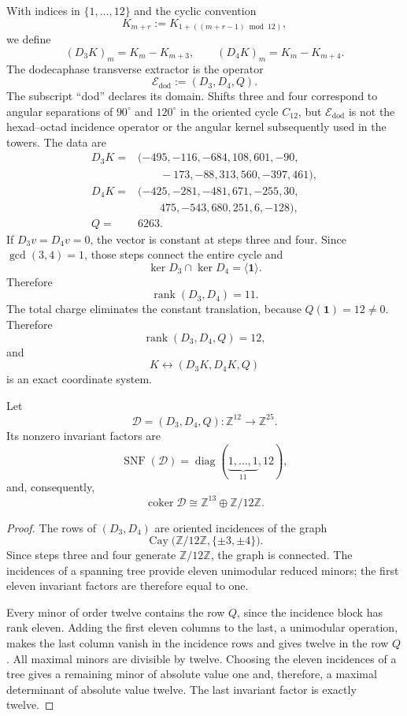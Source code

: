 With indices in \(\{1,\ldots,12\}\) and the cyclic convention
\[
 K_{m+r}:=K_{1+((m+r-1)\bmod12)},
\]
we define
\[
(D_3K)_m=K_m-K_{m+3},
\qquad
(D_4K)_m=K_m-K_{m+4}.
\]
The dodecaphase transverse extractor is the operator
\[
 \mathcal E_{\mathrm{dod}}
 :=(D_3,D_4,Q).
\]
The subscript ``dod'' declares its domain. Shifts three and four
correspond to angular separations of \(90^\circ\) and \(120^\circ\) in the
oriented cycle \(C_{12}\), but \(\mathcal E_{\mathrm{dod}}\) is not the
hexad--octad incidence operator or the angular kernel subsequently used in
the towers.
The data are
\[
\begin{aligned}
D_3K={}&(-495,-116,-684,108,601,-90,\\
       &\qquad-173,-88,313,560,-397,461),\\[1mm]
D_4K={}&(-425,-281,-481,671,-255,30,\\
       &\qquad475,-543,680,251,6,-128),\\[1mm]
Q={}&6263.
\end{aligned}
\]
If \(D_3v=D_4v=0\), the vector is constant at steps three and four. Since
\(\gcd(3,4)=1\), those steps connect the entire cycle and
\[
\ker D_3\cap\ker D_4=\langle\mathbf1\rangle.
\]
Therefore
\[
\operatorname{rank}(D_3,D_4)=11.
\]
The total charge eliminates the constant translation, because
\(Q(\mathbf1)=12\ne0\). Therefore
\[
\boxed{\operatorname{rank}(D_3,D_4,Q)=12,}
\]
and
\[
K\longleftrightarrow(D_3K,D_4K,Q)
\]
is an exact coordinate system.

\begin{theorem}
\label{thm:smith-dodecafase}
Let
\[
 \mathcal D=(D_3,D_4,Q):
 \mathbb Z^{12}\longrightarrow\mathbb Z^{25}.
\]
Its nonzero invariant factors are
\[
 \operatorname{SNF}(\mathcal D)
 =\operatorname{diag}(\underbrace{1,\ldots,1}_{11},12),
\]
and, consequently,
\[
 \operatorname{coker}\mathcal D
 \cong\mathbb Z^{13}\oplus\mathbb Z/12\mathbb Z.
\]
\end{theorem}

\begin{proof}
The rows of \((D_3,D_4)\) are oriented incidences of the graph
\[
 \operatorname{Cay}
 \bigl(\mathbb Z/12\mathbb Z,\{\pm3,\pm4\}\bigr).
\]
Since steps three and four generate \(\mathbb Z/12\mathbb Z\), the graph
is connected.
The incidences of a spanning tree provide eleven unimodular reduced
minors; the first eleven invariant factors are therefore equal to
one.

Every minor of order twelve contains the row \(Q\), since the incidence
block has rank eleven. Adding the first eleven columns to the
last, a unimodular operation, makes the last column vanish in the incidence
rows and gives twelve in the row \(Q\). All maximal minors are
divisible by twelve. Choosing the eleven incidences of a tree gives a
remaining minor of absolute value one and, therefore, a maximal determinant
of absolute value twelve. The last invariant factor is exactly twelve.
\end{proof}

